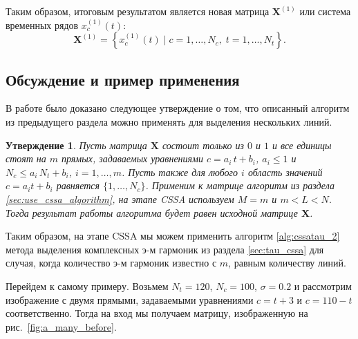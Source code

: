 \documentclass[specialist,
               substylefile = spbu.rtx,
               subf,href,colorlinks=true, 12pt]{disser}
\newtheorem{Th}{Утверждение}
\begin{document}
{{\begin{enumerate}
Таким образом, итоговым результатом является новая матрица $\mathbf{X}^{(1)}$ или система временных рядов $x_c^{(1)}(t)$:
\begin{equation*}
    \mathbf{X}^{(1)}=\left\{x_c^{(1)}(t) \; | \; c=1, \ldots, N_c, \; t=1, \ldots, N_t\right\}.
\end{equation*}
\end{enumerate} 

\subsection{Обсуждение и пример применения}
В работе \cite{Zhornikova2016} было доказано следующее утверждение о том, что описанный алгоритм из предыдущего раздела можно применять для выделения нескольких линий. 

\begin{Th} \cite[Утверждение 20]{Zhornikova2016}
Пусть матрица $\mathbf{X}$ состоит только из $0$ и $1$ и все единицы стоят на $m$ прямых, задаваемых уравнениями $c = a_i\,t + b_i$,  $a_i \leqslant 1$ и $N_c \leqslant a_i\,N_t + b_i$, $i=1,\ldots,m$. Пусть также для любого $i$ 
область значений $c = a_i t + b_i$ равняется $\{1,\ldots,N_c\}$.
Применим к матрице алгоритм из раздела \ref{sec:use_cssa_algorithm}, на этапе CSSA используем $M = m$ и $m<L<N$. Тогда результат работы алгоритма будет равен исходной матрице $\mathbf{X}$.
\end{Th}

Таким образом, на этапе CSSA мы можем применить алгоритм \ref{alg:cssatau_2} метода выделения комплексных э-м гармоник из раздела \ref{sec:tau_cssa} для случая, когда количество э-м гармоник известно с $m$, равным количеству линий.

Перейдем к самому примеру.
Возьмем $N_t = 120$, $N_c = 100$, $\sigma = 0.2$ и рассмотрим изображение с двумя прямыми, задаваемыми уравнениями $c = t + 3$ и $c = 110 - t$ соответственно. Тогда на вход мы получаем матрицу, изображенную на рис.~\ref{fig:a_many_before}. 

}}
\end{document}
